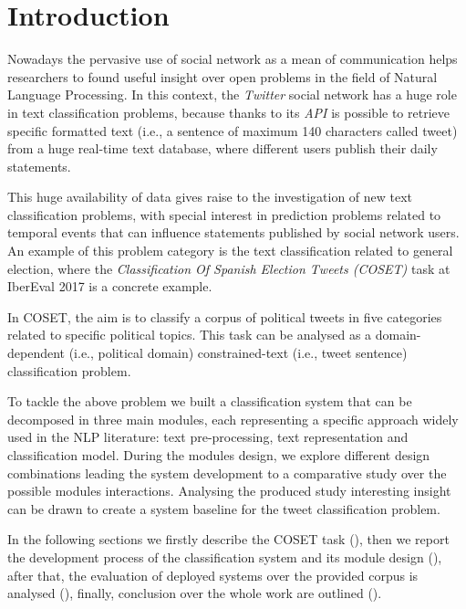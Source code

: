 \section{Introduction} \label{sec:introduction}

Nowadays the pervasive use of social network as a mean of communication helps researchers to found useful insight over open problems in the field of Natural Language Processing. %
In this context, the \emph{Twitter} social network has a huge role in text classification problems, because thanks to its \emph{API} is possible to retrieve specific formatted text (i.e., a sentence of maximum 140 characters called tweet) from a huge real-time text database, where different users publish their daily statements.

This huge availability of data gives raise to the investigation of new text classification problems, with special interest in prediction problems related to temporal events that can influence statements published by social network users. An example of this problem category is the text classification related to general election, where the  \emph{Classification Of Spanish Election Tweets (COSET)} task at IberEval 2017 is a concrete example. %

In COSET, the aim is to classify a corpus of political tweets in five categories related to specific political topics. This task can be analysed as a domain-dependent (i.e., political domain) constrained-text (i.e., tweet sentence) classification problem.

To tackle the above problem we built a classification system that can be decomposed in three main modules, each representing a specific approach widely used in the NLP literature: text pre-processing, text representation and classification model.
During the modules design, we explore different design combinations leading the system development to a comparative study over the possible modules interactions.
Analysing the produced study interesting insight can be drawn to create a system baseline for the tweet classification problem.

In the following sections we firstly describe the COSET task (), then we report the development process of the classification system and its module design (), after that, the evaluation of deployed systems over the provided corpus is analysed (), finally, conclusion over the whole work are outlined ().



